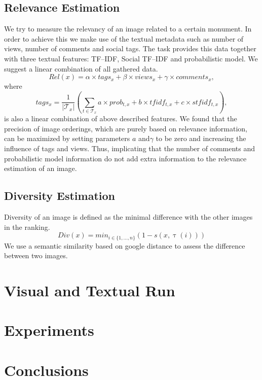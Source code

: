 \documentclass{acm_proc_article-me11_tweaked}
\begin{document}
\subsection{Relevance Estimation}
We try to measure the relevancy of an image related to a certain monument.
In order to achieve this we make use of the textual metadata such as number of views, number of comments and social tags.
The task provides this data together with three textual features: TF--IDF, Social TF--IDF and probabilistic model.
We suggest a linear combination of all gathered data.
$$
Rel(x) = \alpha \times tags_x + \beta \times views_x + \gamma \times comments_x,
$$
where
$$
tags_x = \frac{1}{|\mathscr{T}_x|} \left( \sum_{t \in \mathscr{T}_x} a\times prob_{t,x} + b\times tfidf_{t,x} + c\times stfidf_{t,x}\right), 
$$
is also a linear combination of above described features.
We found that the precision of image orderings, which are purely based on relevance information, can be maximized by setting parameters $a$ and$\gamma$ to be zero and increasing the influence of tags and views.
Thus, implicating that the number of comments and probabilistic model information do not add extra information to the relevance estimation of an image.

\subsection{Diversity Estimation}
Diversity of an image is defined as the minimal difference with the other images in the ranking.
$$Div(x) = min_{i \in \{1,\ldots,n\}}\left( 1 - s(x, \uptau(i))\right)$$
We use a semantic similarity based on google distance \cite{google-distance} to assess the difference between two images.


\section{Visual and Textual Run}


\section{Experiments}


\section{Conclusions}


%

\end{document}
